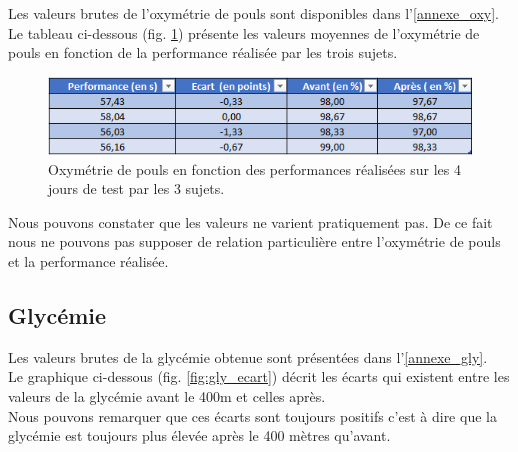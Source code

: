             Les valeurs brutes de l'oxymétrie de pouls sont disponibles dans l'\autoref{annexe_oxy}.\\
             
            Le tableau ci-dessous (fig. \ref{fig:oxy_recap}) présente les valeurs moyennes de l'oxymétrie de pouls en fonction de la performance réalisée par les trois sujets.\\
    
            \begin{figure}[H]
                \centering
                \includegraphics[scale=1]{images/oxy_recap}
                \caption{\label{fig:oxy_recap}Oxymétrie de pouls en fonction des performances réalisées sur les 4 jours de test par les 3 sujets.}
            \end{figure}
            
            Nous pouvons constater que les valeurs ne varient pratiquement pas. De ce fait nous ne pouvons pas supposer de relation particulière entre l'oxymétrie de pouls et la performance réalisée.\\
        
      
        \subsection{Glycémie}
        \label{section:resGlycemie}
        
            Les valeurs brutes de la glycémie obtenue sont présentées dans l'\autoref{annexe_gly}.\\
             
            Le graphique ci-dessous (fig. \ref{fig:gly_ecart}) décrit les écarts qui existent entre les valeurs de la glycémie avant le 400m et celles après. \\
            
            Nous pouvons remarquer que ces écarts sont toujours positifs c'est à dire que la glycémie est toujours plus élevée après le 400 mètres qu'avant.
    
